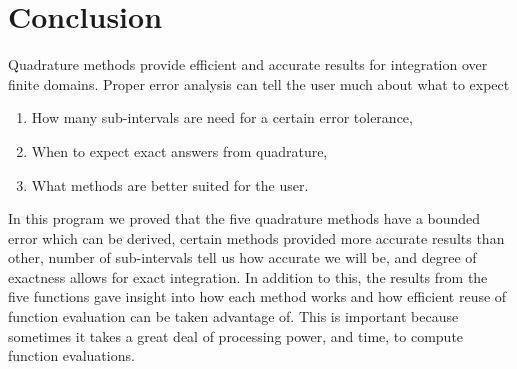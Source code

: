 \documentclass[12pt]{article}
\theoremstyle{remark}
\begin{document}
\newpage

\section{Conclusion}

Quadrature methods provide efficient and accurate results for integration over finite domains. Proper error analysis can tell the user much about what to expect
\begin{enumerate}
	\item How many sub-intervals are need for a certain error tolerance,
	\item When to expect exact answers from quadrature,
	\item What methods are better suited for the user.
\end{enumerate}
In this program we proved that the five quadrature methods have a bounded error which can be derived, certain methods provided more accurate results than other, number of sub-intervals tell us how accurate we will be, and degree of exactness allows for exact integration. In addition to this, the results from the five functions gave insight into how each method works and how efficient reuse of function evaluation can be taken advantage of. This is important because sometimes it takes a great deal of processing power, and time, to compute function evaluations. 
\end{document}
